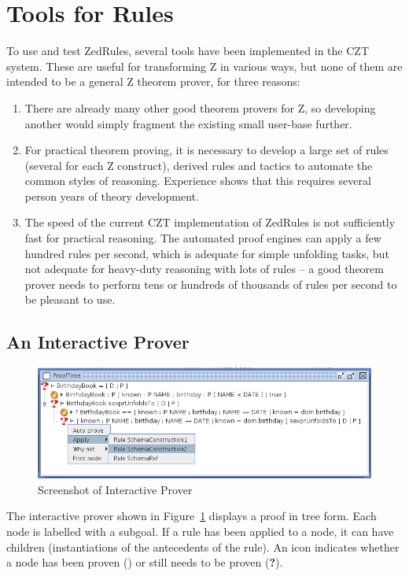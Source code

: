 \documentclass{entcs}
\begin{document}
\section{Tools for Rules} \label{sec:tools}

To use and test ZedRules, several tools have been implemented in the
CZT system.  These are useful for transforming Z in various ways, but
none of them are intended to be a general Z theorem prover, for three
reasons:
\begin{enumerate}
\item There are already many other good theorem provers for Z, so
  developing another would simply fragment the existing small
  user-base further.
\item For practical theorem proving, it is necessary to develop a large set
  of rules (several for each Z construct), derived rules and tactics to
  automate the common styles of reasoning.  Experience shows that this
  requires several person years of theory development. 
\item The speed of the current CZT implementation of ZedRules is not
  sufficiently fast for practical reasoning.  The automated proof engines can
  apply a few hundred rules per second, which is adequate for simple unfolding
  tasks, but not adequate for heavy-duty reasoning with lots of rules --
  a good theorem prover needs to perform tens or hundreds of thousands of
  rules per second to be pleasant to use.
\end{enumerate}


\subsection{An Interactive Prover}

\begin{figure}[htbp]
  \centering
  \includegraphics[width=\textwidth]{cztprover1}
  \caption{Screenshot of Interactive Prover}
  \label{fig:cztprover}
\end{figure}

The interactive prover shown in Figure~\ref{fig:cztprover} displays a
proof in tree form.  Each node is labelled with a subgoal.  If a rule
has been applied to a node, it can have children (instantiations of
the antecedents of the rule).  An icon indicates whether a node has
been proven () or still needs to be proven ({\bf ?}).
\end{document}
